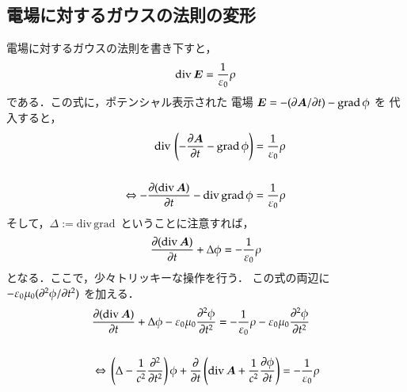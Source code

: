         \subsection{電場に対するガウスの法則の変形}
            電場に対するガウスの法則を書き下すと，
            \begin{align}
            \mathrm{div}\,\boldsymbol{E}
            =\frac{1}{\varepsilon_{0}}\rho
            \end{align}
            である．この式に，ポテンシャル表示された
            電場 $\displaystyle\boldsymbol{E} = -(\partial\boldsymbol{A}/\partial t) -\mathrm{grad\,}\phi$ を
            代入すると，
            \begin{align}
            \mathrm{div}\,\left(-\frac{\partial\boldsymbol{A}}{\partial t}-\mathrm{grad\,}\phi\right)
            =\frac{1}{\varepsilon_{0}}\rho \notag \\  \notag \\
            \Leftrightarrow
            -\frac{\partial(\mathrm{div\,}\boldsymbol{A})}{\partial t}-\mathrm{div\,grad\,}\phi
            =\frac{1}{\varepsilon_{0}}\rho
            \end{align}
            そして，$\Delta:=\mathrm{div\,grad\,}$ ということに注意すれば，
            \begin{align}
            \frac{\partial(\mathrm{div\,}\boldsymbol{A})}{\partial t}+\Delta\phi
            =-\frac{1}{\varepsilon_{0}}\rho
            \end{align}
            となる．ここで，少々トリッキーな操作を行う．
            この式の両辺に $-\varepsilon_{0}\mu_{0}(\partial^{2} \phi/\partial t^{2})$ を加える．
            \begin{align}
            &\frac{\partial(\mathrm{div\,}\boldsymbol{A})}{\partial t}+\Delta\phi
            -\varepsilon_{0}\mu_{0}\frac{\partial^{2} \phi}{\partial t^{2}}
            =-\frac{1}{\varepsilon_{0}}\rho -\varepsilon_{0}\mu_{0}\frac{\partial^{2} \phi}{\partial t^{2}}\notag \\ \notag \\
            &\Leftrightarrow\,
            \left(\Delta
            -\frac{1}{c^{2}}\frac{\partial^{2} }{\partial t^{2}}\right)\phi
            +\frac{\partial}{\partial t}\left(\mathrm{div\,}\boldsymbol{A}
            +\frac{1}{c^{2}}\frac{\partial \phi}{\partial t}
            \right)
            =-\frac{1}{\varepsilon_{0}}\rho
            \end{align}


